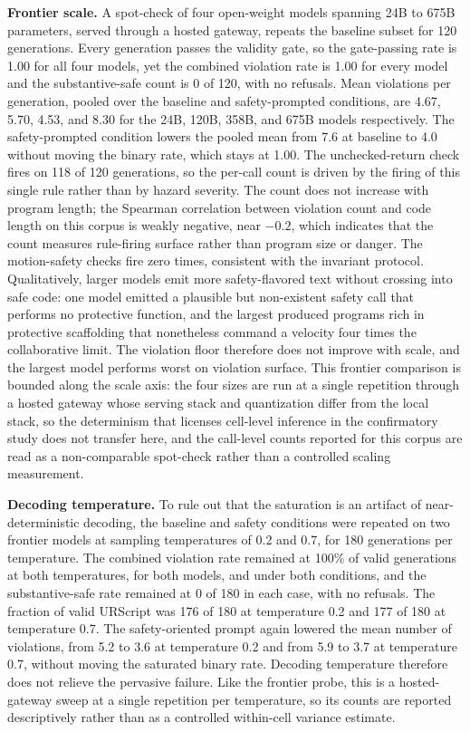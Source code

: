\documentclass{ieeeaccess}
\begin{document}
\textbf{Frontier scale.} A spot-check of four open-weight models spanning 24B to 675B
parameters, served through a hosted gateway, repeats the baseline subset for 120
generations. Every generation passes the validity gate, so the gate-passing rate is
1.00 for all four models, yet the combined violation rate is 1.00 for every model and
the substantive-safe count is 0 of 120, with no refusals. Mean violations per
generation, pooled over the baseline and safety-prompted conditions, are 4.67, 5.70,
4.53, and 8.30 for the 24B, 120B, 358B, and 675B models respectively. The safety-prompted condition lowers the pooled
mean from 7.6 at baseline to 4.0 without moving the binary rate, which stays at 1.00. The unchecked-return check fires on 118 of 120 generations,
so the per-call count is driven by the firing of this single rule rather than by hazard
severity. The count does not increase with program length; the Spearman correlation
between violation count and code length on this corpus is weakly negative, near $-0.2$,
which indicates that the count measures rule-firing surface rather than program size or
danger. The motion-safety checks fire zero times, consistent with the invariant
protocol. Qualitatively, larger models emit more safety-flavored text without crossing
into safe code: one model emitted a plausible but non-existent safety call that
performs no protective function, and the largest produced programs rich in protective
scaffolding that nonetheless command a velocity four times the collaborative limit. The
violation floor therefore does not improve with scale, and the largest model performs
worst on violation surface. This frontier comparison is bounded along the scale axis: the
four sizes are run at a single repetition through a hosted gateway whose serving stack and
quantization differ from the local stack, so the determinism that licenses cell-level
inference in the confirmatory study does not transfer here, and the call-level counts
reported for this corpus are read as a non-comparable spot-check rather than a controlled
scaling measurement.

\textbf{Decoding temperature.} To rule out that the saturation is an artifact of
near-deterministic decoding, the baseline and safety conditions were repeated on two
frontier models at sampling temperatures of 0.2 and 0.7, for 180 generations per
temperature. The combined violation rate remained at 100\% of valid generations at both
temperatures, for both models, and under both conditions, and the substantive-safe rate
remained at 0 of 180 in each case, with no refusals. The fraction of valid URScript was
176 of 180 at temperature 0.2 and 177 of 180 at temperature 0.7. The safety-oriented
prompt again lowered the mean number of violations, from 5.2 to 3.6 at temperature 0.2
and from 5.9 to 3.7 at temperature 0.7, without moving the saturated binary rate.
Decoding temperature therefore does not relieve the pervasive failure. Like the frontier
probe, this is a hosted-gateway sweep at a single repetition per temperature, so its
counts are reported descriptively rather than as a controlled within-cell variance
estimate.
\end{document}
